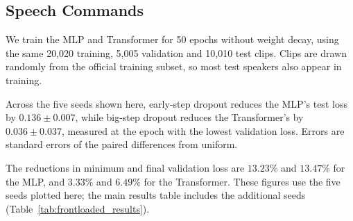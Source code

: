 
\FloatBarrier
\noindent\begin{minipage}{\textwidth}
\subsection{Speech Commands}
We train the MLP and Transformer for 50 epochs without weight decay, using the same 20,020 training, 5,005 validation and 10,010 test clips. Clips are drawn randomly from the official training subset, so most test speakers also appear in training.

Across the five seeds shown here, early-step dropout reduces the MLP's test loss by $0.136\pm0.007$, while big-step dropout reduces the Transformer's by $0.036\pm0.037$, measured at the epoch with the lowest validation loss. Errors are standard errors of the paired differences from uniform.

The reductions in minimum and final validation loss are $13.23\%$ and $13.47\%$ for the MLP, and $3.33\%$ and $6.49\%$ for the Transformer. These figures use the five seeds plotted here; the main results table includes the additional seeds (Table~\ref{tab:frontloaded_results}).


\end{minipage}
